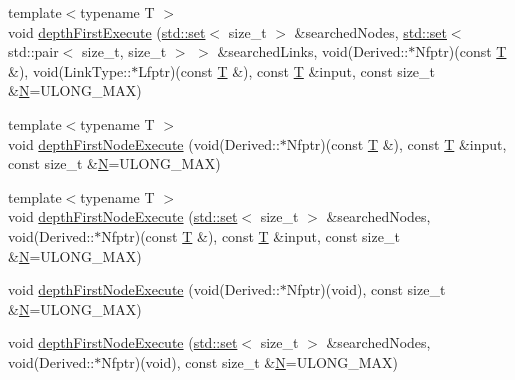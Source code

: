\begin{DoxyCompactItemize}
\item 
{\footnotesize template$<$typename T $>$ }\\void \hyperlink{classmodel_1_1_network_node_a4cf1575fc466e64950703fdcd04732eb}{depth\+First\+Execute} (\hyperlink{plot_cells_8m_a03623d69001c34fc77654be29bdc3d8a}{std\+::set}$<$ size\+\_\+t $>$ \&searched\+Nodes, \hyperlink{plot_cells_8m_a03623d69001c34fc77654be29bdc3d8a}{std\+::set}$<$ std\+::pair$<$ size\+\_\+t, size\+\_\+t $>$ $>$ \&searched\+Links, void(Derived\+::$\ast$Nfptr)(const \hyperlink{_spline_node_base__corder1_8h_a82692d3a5502b91460591f1d5504314a}{T} \&), void(Link\+Type\+::$\ast$Lfptr)(const \hyperlink{_spline_node_base__corder1_8h_a82692d3a5502b91460591f1d5504314a}{T} \&), const \hyperlink{_spline_node_base__corder1_8h_a82692d3a5502b91460591f1d5504314a}{T} \&input, const size\+\_\+t \&\hyperlink{thompson__tetrahedron_8m_a7823765a845eb81829f110d8337f81ae}{N}=U\+L\+O\+N\+G\+\_\+\+M\+A\+X)
\item 
{\footnotesize template$<$typename T $>$ }\\void \hyperlink{classmodel_1_1_network_node_abbef6f66c7c6bdb7c29eba5975d19376}{depth\+First\+Node\+Execute} (void(Derived\+::$\ast$Nfptr)(const \hyperlink{_spline_node_base__corder1_8h_a82692d3a5502b91460591f1d5504314a}{T} \&), const \hyperlink{_spline_node_base__corder1_8h_a82692d3a5502b91460591f1d5504314a}{T} \&input, const size\+\_\+t \&\hyperlink{thompson__tetrahedron_8m_a7823765a845eb81829f110d8337f81ae}{N}=U\+L\+O\+N\+G\+\_\+\+M\+A\+X)
\item 
{\footnotesize template$<$typename T $>$ }\\void \hyperlink{classmodel_1_1_network_node_a25e46eecff5e7b9a45f6e48a3495d918}{depth\+First\+Node\+Execute} (\hyperlink{plot_cells_8m_a03623d69001c34fc77654be29bdc3d8a}{std\+::set}$<$ size\+\_\+t $>$ \&searched\+Nodes, void(Derived\+::$\ast$Nfptr)(const \hyperlink{_spline_node_base__corder1_8h_a82692d3a5502b91460591f1d5504314a}{T} \&), const \hyperlink{_spline_node_base__corder1_8h_a82692d3a5502b91460591f1d5504314a}{T} \&input, const size\+\_\+t \&\hyperlink{thompson__tetrahedron_8m_a7823765a845eb81829f110d8337f81ae}{N}=U\+L\+O\+N\+G\+\_\+\+M\+A\+X)
\item 
void \hyperlink{classmodel_1_1_network_node_a79f724ce14249cfca32cbf67f6af9dcb}{depth\+First\+Node\+Execute} (void(Derived\+::$\ast$Nfptr)(void), const size\+\_\+t \&\hyperlink{thompson__tetrahedron_8m_a7823765a845eb81829f110d8337f81ae}{N}=U\+L\+O\+N\+G\+\_\+\+M\+A\+X)
\item 
void \hyperlink{classmodel_1_1_network_node_a9e54b3692574a0a2e6159aa2a4ae8beb}{depth\+First\+Node\+Execute} (\hyperlink{plot_cells_8m_a03623d69001c34fc77654be29bdc3d8a}{std\+::set}$<$ size\+\_\+t $>$ \&searched\+Nodes, void(Derived\+::$\ast$Nfptr)(void), const size\+\_\+t \&\hyperlink{thompson__tetrahedron_8m_a7823765a845eb81829f110d8337f81ae}{N}=U\+L\+O\+N\+G\+\_\+\+M\+A\+X)

\end{DoxyCompactItemize}
